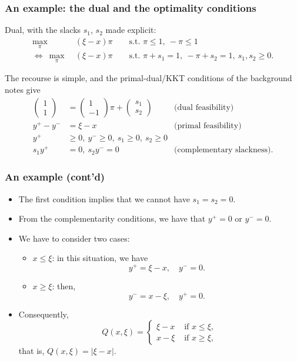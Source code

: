 \documentclass[aspectratio=169]{beamer}
\begin{document}
\begin{frame}
\frametitle{An example: the dual and the optimality conditions}

Dual, with the slacks $s_1$, $s_2$ made explicit:
\begin{align*}
\max_{\pi}\ & (\xi-x)\pi \qquad \text{s.t. } \pi \leq 1,\ -\pi \leq 1 \\
\Longleftrightarrow\ \max_{\pi}\ & (\xi-x)\pi \qquad \text{s.t. }
\pi + s_1 = 1,\ -\pi + s_2 = 1,\ s_1, s_2 \geq 0.
\end{align*}

The recourse is simple, and the primal-dual/KKT conditions of the background notes give
\begin{align*}
\begin{pmatrix} 1 \\ 1 \end{pmatrix} & = \begin{pmatrix} 1 \\
  -1 \end{pmatrix} \pi + \begin{pmatrix} s_1 \\ s_2 \end{pmatrix}
  & \text{(dual feasibility)} \\
y^+ - y^- & = \xi - x & \text{(primal feasibility)} \\
y^+ &\geq 0,\  y^- \geq 0,\ s_1 \geq 0,\ s_2 \geq 0 \\
s_1y^+ & = 0,\ s_2y^- = 0 & \text{(complementary slackness)}.
\end{align*}

\end{frame}

\begin{frame}
\frametitle{An example (cont'd)}

\begin{itemize}
\item
The first condition implies that we cannot have
$s_1 = s_2 = 0$.
\item
From the complementarity conditions, we have that $y^+ = 0$ or $y^-
= 0$.
\item
We have to consider two cases:
\begin{itemize}
\item
$x \leq \xi$: in this situation, we have
\[
y^+ = \xi -x,\quad y^- = 0.
\]
\item
$x \geq \xi$: then,
\[
y^- = x-\xi,\quad y^+ = 0.
\]
\end{itemize}
\item
Consequently,
\[
Q(x,\xi) = \begin{cases} \xi-x & \text{ if } x \leq \xi, \\
	x - \xi & \text{ if } x \geq \xi, \end{cases}
\]
that is, $Q(x,\xi) = |\xi - x|$.
\end{itemize}

\end{frame}
\end{document}
